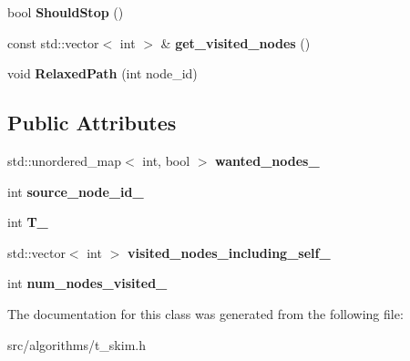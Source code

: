 \begin{DoxyCompactItemize}
\item 
\hypertarget{classall__distance__sketch_1_1TSkimDijkstraCallBacks_af22314880fe08e16f74698972eefe0f5}{}bool {\bfseries Should\+Stop} ()\label{classall__distance__sketch_1_1TSkimDijkstraCallBacks_af22314880fe08e16f74698972eefe0f5}

\item 
\hypertarget{classall__distance__sketch_1_1TSkimDijkstraCallBacks_a20c664d1f403a154fbbe20a8c416d98f}{}const std\+::vector$<$ int $>$ \& {\bfseries get\+\_\+visited\+\_\+nodes} ()\label{classall__distance__sketch_1_1TSkimDijkstraCallBacks_a20c664d1f403a154fbbe20a8c416d98f}

\item 
\hypertarget{classall__distance__sketch_1_1TSkimDijkstraCallBacks_a981c232766efadfa4d479485cd205788}{}void {\bfseries Relaxed\+Path} (int node\+\_\+id)\label{classall__distance__sketch_1_1TSkimDijkstraCallBacks_a981c232766efadfa4d479485cd205788}

\end{DoxyCompactItemize}
\subsection*{Public Attributes}
\begin{DoxyCompactItemize}
\item 
\hypertarget{classall__distance__sketch_1_1TSkimDijkstraCallBacks_a8c92522c236e4ee001582e50749f148a}{}std\+::unordered\+\_\+map$<$ int, bool $>$ {\bfseries wanted\+\_\+nodes\+\_\+}\label{classall__distance__sketch_1_1TSkimDijkstraCallBacks_a8c92522c236e4ee001582e50749f148a}

\item 
\hypertarget{classall__distance__sketch_1_1TSkimDijkstraCallBacks_a2a039aaf8e48dd6fbb9eaa1ee4b522a2}{}int {\bfseries source\+\_\+node\+\_\+id\+\_\+}\label{classall__distance__sketch_1_1TSkimDijkstraCallBacks_a2a039aaf8e48dd6fbb9eaa1ee4b522a2}

\item 
\hypertarget{classall__distance__sketch_1_1TSkimDijkstraCallBacks_a1ab8229b3fed12273ad7538133cca459}{}int {\bfseries T\+\_\+}\label{classall__distance__sketch_1_1TSkimDijkstraCallBacks_a1ab8229b3fed12273ad7538133cca459}

\item 
\hypertarget{classall__distance__sketch_1_1TSkimDijkstraCallBacks_a89e72be56cfbeb7b1dabe1140deb2d32}{}std\+::vector$<$ int $>$ {\bfseries visited\+\_\+nodes\+\_\+including\+\_\+self\+\_\+}\label{classall__distance__sketch_1_1TSkimDijkstraCallBacks_a89e72be56cfbeb7b1dabe1140deb2d32}

\item 
\hypertarget{classall__distance__sketch_1_1TSkimDijkstraCallBacks_a463b3add09c435c7dddfecdcc88e7152}{}int {\bfseries num\+\_\+nodes\+\_\+visited\+\_\+}\label{classall__distance__sketch_1_1TSkimDijkstraCallBacks_a463b3add09c435c7dddfecdcc88e7152}

\end{DoxyCompactItemize}


The documentation for this class was generated from the following file\+:\begin{DoxyCompactItemize}
\item 
src/algorithms/t\+\_\+skim.\+h\end{DoxyCompactItemize}
